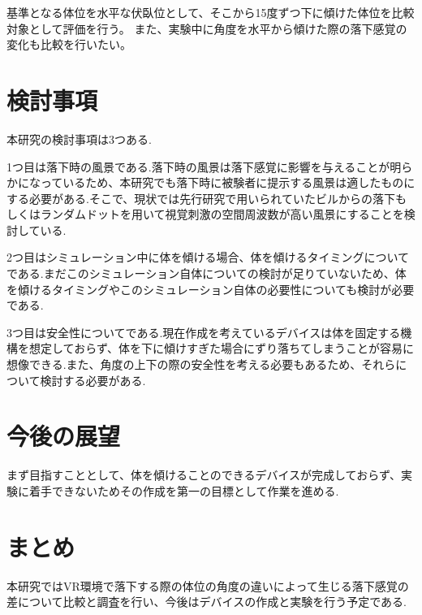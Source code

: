 \documentclass[uplatex]{jsarticle}
\begin{document}
基準となる体位を水平な伏臥位として、そこから15度ずつ下に傾けた体位を比較対象として評価を行う。
また、実験中に角度を水平から傾けた際の落下感覚の変化も比較を行いたい。

\section{検討事項}
本研究の検討事項は3つある.

1つ目は落下時の風景である.落下時の風景は落下感覚に影響を与えることが明らかになっているため、本研究でも落下時に被験者に提示する風景は適したものにする必要がある.そこで、現状では先行研究で用いられていたビルからの落下もしくはランダムドットを用いて視覚刺激の空間周波数が高い風景にすることを検討している.

2つ目はシミュレーション中に体を傾ける場合、体を傾けるタイミングについてである.まだこのシミュレーション自体についての検討が足りていないため、体を傾けるタイミングやこのシミュレーション自体の必要性についても検討が必要である.

3つ目は安全性についてである.現在作成を考えているデバイスは体を固定する機構を想定しておらず、体を下に傾けすぎた場合にずり落ちてしまうことが容易に想像できる.また、角度の上下の際の安全性を考える必要もあるため、それらについて検討する必要がある.

\section{今後の展望}
まず目指すこととして、体を傾けることのできるデバイスが完成しておらず、実験に着手できないためその作成を第一の目標として作業を進める.

\section{まとめ}
本研究ではVR環境で落下する際の体位の角度の違いによって生じる落下感覚の差について比較と調査を行い、今後はデバイスの作成と実験を行う予定である.


 
\end{document}
